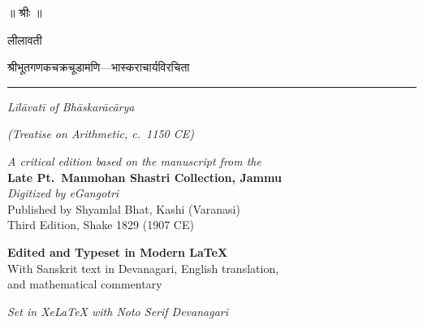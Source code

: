 \documentclass[11pt,a4paper]{book}
\newcommand{\shortline}{\noindent\rule{0.5\textwidth}{0.4pt}\par}
\begin{document}
\begin{titlepage}
\centering
\vspace*{1.5cm}

{\Huge\devanagarifont\textcolor{titlecolor}{॥ श्रीः ॥}}

\vspace{1.5cm}

{\fontsize{36}{44}\selectfont\devanagarifont\textcolor{titlecolor}{लीलावती}}

\vspace{0.8cm}

{\LARGE\devanagarifont\textcolor{sectioncolor}{श्रीभूतगणकचक्रचूडामणि—भास्कराचार्यविरचिता}}

\vspace{0.5cm}
\shortline
\vspace{0.5cm}

{\large\textit{Līlāvatī of Bhāskarācārya}}

{\normalsize\textit{(Treatise on Arithmetic, c.\ 1150 CE)}}

\vspace{1.5cm}

\begin{minipage}{0.8\textwidth}
\centering
\textit{A critical edition based on the manuscript from the}\\
\textbf{Late Pt.\ Manmohan Shastri Collection, Jammu}\\
\textit{Digitized by eGangotri}\\[0.5em]
Published by Shyamlal Bhat, Kashi (Varanasi)\\
Third Edition, Shake 1829 (1907 CE)
\end{minipage}

\vspace{2cm}

{\large\textbf{Edited and Typeset in Modern LaTeX}}\\[0.5em]
{\normalsize With Sanskrit text in Devanagari, English translation,\\
and mathematical commentary}

\vfill

{\small\textit{Set in XeLaTeX with Noto Serif Devanagari}}

\end{titlepage}

\frontmatter
\pagestyle{plain}
\end{document}
